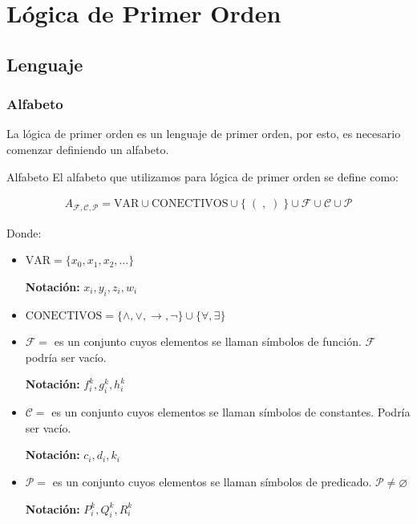 \chapter{Lógica de Primer Orden}
\graphicspath{ {./teoria/resources/logica-primer-orden/} }

\section{Lenguaje}

\subsection{Alfabeto}
La lógica de primer orden es un lenguaje de primer orden, por esto, es 
necesario comenzar definiendo un alfabeto.

\begin{definicion}{Alfabeto}{}
    El alfabeto que utilizamos para lógica de primer orden se define como:

    \begin{gather*}
        A_{\mathcal{F}, \mathcal{C}, \mathcal{P}} =
        \mathrm{VAR}
        \cup \mathrm{ CONECTIVOS }
        \cup \{\;(\;,\; )\;\}
        \cup \mathcal{F}
        \cup \mathcal{C}
        \cup \mathcal{P}
    \end{gather*}

    \medskip

    Donde:
    
    \begin{itemize}
    \item $\mathrm{VAR} = \{ x_0, x_1, x_2, \dots \}$

    \bigskip
    \textbf{Notación:}
    $x_i, y_i, z_i, w_i$

    \item $\mathrm{CONECTIVOS } = \{ \wedge,\vee,\to,\neg \} \cup 
        \{ \forall, \exists \}$

    \item $\mathcal{F} =$ es un conjunto cuyos elementos se llaman símbolos de 
    función. 
    $\mathcal{F}$ podría ser vacío.

    \bigskip
    \textbf{Notación:}
    $f_i^k, g_i^k, h_i^k$

    \item $\mathcal{C} = $ es un conjunto cuyos elementos se llaman símbolos de
    constantes.
    Podría ser vacío.

    \bigskip
    \textbf{Notación:}
    $c_i, d_i, k_i$

    \item $\mathcal{P} = $ es un conjunto cuyos elementos se llaman símbolos de
    predicado. $\mathcal{P} \neq \varnothing$

    \bigskip
    \textbf{Notación:}
    $P_i^k, Q_i^k, R_i^k$
    \end{itemize}
\end{definicion}

